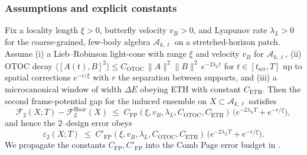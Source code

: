 \documentclass[11pt,a4paper]{article}
\theoremstyle{plain}
\theoremstyle{definition}
\theoremstyle{remark}
\begin{document}
\begin{algorithm}[t]
\caption{Estimating $\varepsilon_{\mathrm{na}}$ from data}
\label{alg:ena}
\end{algorithm}

\subsubsection{Assumptions and explicit constants}
Fix a locality length $\xi>0$, butterfly velocity $v_B>0$, and Lyapunov rate $\lambda_L>0$ for the coarse-grained,
few-body algebra $\mathscr{A}_{k,\ell}$ on a stretched-horizon patch. Assume (i) a Lieb--Robinson light-cone
with range $\xi$ and velocity $v_B$ for $\mathscr{A}_{k,\ell}$, (ii) OTOC decay
$\langle [A(t),B]^2\rangle \le C_{\mathrm{OTOC}}\,\|A\|^2\|B\|^2\,e^{-2\lambda_L t}$
for $t\in[t_{\mathrm{scr}},T]$ up to spatial corrections $e^{-r/\xi}$ with $r$ the separation between supports,
and (iii) a microcanonical window of width $\Delta E$ obeying ETH with constant $C_{\mathrm{ETH}}$.
Then the second frame-potential gap for the induced ensemble on $X\subset\mathscr{A}_{k,\ell}$ satisfies
\begin{equation}
\label{eq:fp-gap-constants}
\mathcal{F}_2(X;T)-\mathcal{F}_2^{\mathrm{Haar}}(X)
\;\le\; C_{\mathrm{FP}}(\xi,v_B,\lambda_L,C_{\mathrm{OTOC}},C_{\mathrm{ETH}})\,
\big( e^{-2\lambda_L T} + e^{-r/\xi} \big),
\end{equation}
and hence the $2$--design error obeys
\begin{equation}
\label{eq:eps2-constants}
\varepsilon_2(X;T)\;\le\;C'_{\mathrm{FP}}(\xi,v_B,\lambda_L,C_{\mathrm{OTOC}},C_{\mathrm{ETH}})\,
\big( e^{-2\lambda_L T} + e^{-r/\xi} \big).
\end{equation}
We propagate the constants $C_{\mathrm{FP}},C'_{\mathrm{FP}}$ into the Comb Page error budget in .
\end{document}
